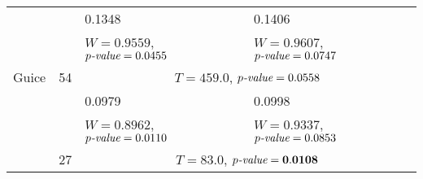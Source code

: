 \begin{table}[]
\begin{adjustbox}{center}
\begin{tabular}{llll}
 &  & 0.1348 & 0.1406 \\
 &  & $W = 0.9559$, $p\emph{-value} = 0.0455$ & $W = 0.9607$, $p\emph{-value} = 0.0747$ \\
\multirow{-3}{*}{Guice} & \multirow{-3}{*}{54} & \multicolumn{2}{c}{$T = 459.0$, $p\emph{-value} = 0.0558$} \\
\rowcolor{Gray}
\cellcolor{Gray} & \cellcolor{Gray} & 0.0979 & 0.0998 \\
\rowcolor{Gray}
\cellcolor{Gray} & \cellcolor{Gray} & $W = 0.8962$, $p\emph{-value} = 0.0110$ & $W = 0.9337$, $p\emph{-value} = 0.0853$ \\
\rowcolor{Gray}
\multirow{-3}{*}{\cellcolor{Gray}Jsoup} & \multirow{-3}{*}{\cellcolor{Gray}27} & \multicolumn{2}{c}{\cellcolor{Gray}$T = 83.0$, $p\emph{-value} = \mathbf{0.0108}$}\\
\bottomrule
\end{tabular}
\end{adjustbox}
\end{table}

